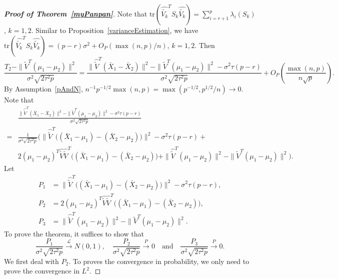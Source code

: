 \documentclass[review]{elsarticle}
\theoremstyle{plain}
\theoremstyle{definition}
\theoremstyle{remark}
\begin{document}
\begin{proof}[\textbf{Proof of Theorem~\ref{myPanpan}}]

    Note that $\mathrm{tr}(\hat{\tilde{V_k}}^T S_k\hat{\tilde{V_k}})=\sum_{i=r+1}^p \lambda_i(S_k)$, $k=1,2$.
    Similar to Proposition~\ref{varianceEstimation}, we have $\mathrm{tr}(\hat{\tilde{V_k}}^T S_k\hat{\tilde{V_k}})=(p-r)\sigma^2+O_P({\max(n,p)}/{n})$, $k=1,2$.
    Then
\begin{equation*}
        \frac{T_2-\|\tilde{V}^T(\mu_1-\mu_2)\|^2}{\sigma^2\sqrt{2\tau^2 p}}
        =
        \frac{\|\hat{\tilde{V}}^T(\bar{X}_1-\bar{X}_2)\|^2-\|\tilde{V}^T(\mu_1-\mu_2)\|^2
        -\sigma^2\tau (p-r)
        }{\sigma^2\sqrt{2\tau^2 p}}
        +O_P(\frac{\max(n,p)}{n\sqrt{p}}).
\end{equation*}
    By Assumption~\ref{pAndN}, ${n^{-1}p^{-1/2}}{\max(n,p)}=\max({p}^{-1/2},{p}^{1/2}/n)\to 0$.
    Note that
\begin{equation*}
    \begin{aligned}
        &\frac{\|\hat{\tilde{V}}^T(\bar{X}_1-\bar{X}_2)\|^2-\|\tilde{V}^T(\mu_1-\mu_2)\|^2
        -\sigma^2\tau (p-r)
        }{\sigma^2\sqrt{2\tau^2 p}}
        \\
        =&\frac{1}{\sigma^2\sqrt{2\tau^2 p}}\Big(
        \|\hat{\tilde{V}}^T\big((\bar{X}_1-\mu_1)-(\bar{X}_2-\mu_2)\big)\|^2-\sigma^2 \tau (p-r)+\\
        &2{(\mu_1-\mu_2)}^T \hat{\tilde{V}}\hat{\tilde{V}}^T\big((\bar{X}_1-\mu_1)-(\bar{X}_2-\mu_2)\big)
        +\|\hat{\tilde{V}}^T(\mu_1-\mu_2)\|^2-\|\tilde{V}^T(\mu_1-\mu_2)\|^2
        \Big).
    \end{aligned}
\end{equation*}
Let 
\begin{align*}
    P_1&=\|\hat{\tilde{V}}^T\big((\bar{X}_1-\mu_1)-(\bar{X}_2-\mu_2)\big)\|^2-\sigma^2 \tau (p-r),\\
    P_2&=2{(\mu_1-\mu_2)}^T \hat{\tilde{V}}\hat{\tilde{V}}^T\big((\bar{X}_1-\mu_1)-(\bar{X}_2-\mu_2)\big),\\
    P_3&=\|\hat{\tilde{V}}^T(\mu_1-\mu_2)\|^2-\|\tilde{V}^T(\mu_1-\mu_2)\|^2.
\end{align*}
To prove the theorem, it suffices to show that
$$
    \frac{P_1}{\sigma^2\sqrt{2\tau^2 p}}\xrightarrow{\mathcal{L}} N(0,1),
    \quad
    \frac{P_2}{\sigma^2\sqrt{2\tau^2 p}}\xrightarrow{P} 0
    \quad
    \textrm{and}
    \quad
    \frac{P_3}{\sigma^2\sqrt{2\tau^2 p}}\xrightarrow{P}0.
    $$
    We first deal with $P_2$.
    To proves the convergence in probability, we only need to prove the convergence in $L^2$.

\end{proof}
\end{document}
